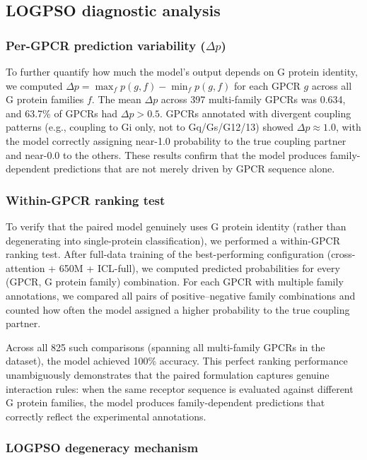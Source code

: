 \documentclass[11pt,a4paper]{article}
\begin{document}
\subsection{LOGPSO diagnostic analysis}

\subsubsection{Per-GPCR prediction variability ($\Delta p$)}
\label{sec:delta_p}

To further quantify how much the model's output depends on G protein identity, we computed $\Delta p = \max_f p(g, f) - \min_f p(g, f)$ for each GPCR $g$ across all G protein families $f$. The mean $\Delta p$ across 397 multi-family GPCRs was 0.634, and 63.7\% of GPCRs had $\Delta p > 0.5$. GPCRs annotated with divergent coupling patterns (e.g., coupling to Gi only, not to Gq/Gs/G12/13) showed $\Delta p \approx 1.0$, with the model correctly assigning near-1.0 probability to the true coupling partner and near-0.0 to the others. These results confirm that the model produces family-dependent predictions that are not merely driven by GPCR sequence alone.

\subsubsection{Within-GPCR ranking test}

To verify that the paired model genuinely uses G protein identity (rather than degenerating into single-protein classification), we performed a within-GPCR ranking test. After full-data training of the best-performing configuration (cross-attention + 650M + ICL-full), we computed predicted probabilities for every (GPCR, G protein family) combination. For each GPCR with multiple family annotations, we compared all pairs of positive--negative family combinations and counted how often the model assigned a higher probability to the true coupling partner.

Across all 825 such comparisons (spanning all multi-family GPCRs in the dataset), the model achieved 100\% accuracy. This perfect ranking performance unambiguously demonstrates that the paired formulation captures genuine interaction rules: when the same receptor sequence is evaluated against different G protein families, the model produces family-dependent predictions that correctly reflect the experimental annotations.

\subsubsection{LOGPSO degeneracy mechanism}
\end{document}
